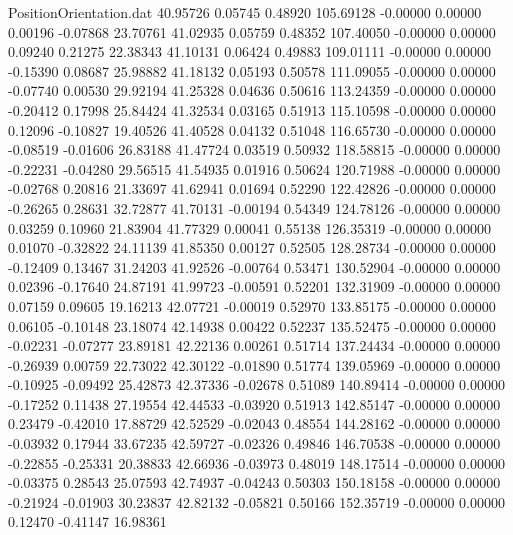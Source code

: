 \begin{filecontents}{PositionOrientation.dat}
  40.95726    0.05745    0.48920   105.69128   -0.00000    0.00000    0.00196   -0.07868   23.70761
  41.02935    0.05759    0.48352   107.40050   -0.00000    0.00000    0.09240    0.21275   22.38343
  41.10131    0.06424    0.49883   109.01111   -0.00000    0.00000   -0.15390    0.08687   25.98882
  41.18132    0.05193    0.50578   111.09055   -0.00000    0.00000   -0.07740    0.00530   29.92194
  41.25328    0.04636    0.50616   113.24359   -0.00000    0.00000   -0.20412    0.17998   25.84424
  41.32534    0.03165    0.51913   115.10598   -0.00000    0.00000    0.12096   -0.10827   19.40526
  41.40528    0.04132    0.51048   116.65730   -0.00000    0.00000   -0.08519   -0.01606   26.83188
  41.47724    0.03519    0.50932   118.58815   -0.00000    0.00000   -0.22231   -0.04280   29.56515
  41.54935    0.01916    0.50624   120.71988   -0.00000    0.00000   -0.02768    0.20816   21.33697
  41.62941    0.01694    0.52290   122.42826   -0.00000    0.00000   -0.26265    0.28631   32.72877
  41.70131   -0.00194    0.54349   124.78126   -0.00000    0.00000    0.03259    0.10960   21.83904
  41.77329    0.00041    0.55138   126.35319   -0.00000    0.00000    0.01070   -0.32822   24.11139
  41.85350    0.00127    0.52505   128.28734   -0.00000    0.00000   -0.12409    0.13467   31.24203
  41.92526   -0.00764    0.53471   130.52904   -0.00000    0.00000    0.02396   -0.17640   24.87191
  41.99723   -0.00591    0.52201   132.31909   -0.00000    0.00000    0.07159    0.09605   19.16213
  42.07721   -0.00019    0.52970   133.85175   -0.00000    0.00000    0.06105   -0.10148   23.18074
  42.14938    0.00422    0.52237   135.52475   -0.00000    0.00000   -0.02231   -0.07277   23.89181
  42.22136    0.00261    0.51714   137.24434   -0.00000    0.00000   -0.26939    0.00759   22.73022
  42.30122   -0.01890    0.51774   139.05969   -0.00000    0.00000   -0.10925   -0.09492   25.42873
  42.37336   -0.02678    0.51089   140.89414   -0.00000    0.00000   -0.17252    0.11438   27.19554
  42.44533   -0.03920    0.51913   142.85147   -0.00000    0.00000    0.23479   -0.42010   17.88729
  42.52529   -0.02043    0.48554   144.28162   -0.00000    0.00000   -0.03932    0.17944   33.67235
  42.59727   -0.02326    0.49846   146.70538   -0.00000    0.00000   -0.22855   -0.25331   20.38833
  42.66936   -0.03973    0.48019   148.17514   -0.00000    0.00000   -0.03375    0.28543   25.07593
  42.74937   -0.04243    0.50303   150.18158   -0.00000    0.00000   -0.21924   -0.01903   30.23837
  42.82132   -0.05821    0.50166   152.35719   -0.00000    0.00000    0.12470   -0.41147   16.98361

\end{filecontents}

